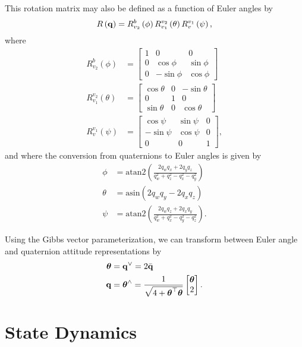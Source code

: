 \documentclass[english]{article}
\begin{document}
This rotation matrix may also be defined as a function of Euler angles by
\begin{equation}
R\left(\bf{q}\right) = R_{v_2}^b\left(\phi\right)R_{v_1}^{v_2}\left(\theta\right)R_v^{v_1}\left(\psi\right),
\end{equation}
where
\begin{align}
R_{v_2}^b\left(\phi\right) & = \begin{bmatrix} 1 & 0 & 0 \\ 0 & \cos\phi & \sin\phi \\ 0 & -\sin\phi & \cos\phi \end{bmatrix} \\
R_{v_1}^{v_2}\left(\theta\right) & = \begin{bmatrix} \cos\theta & 0 & -\sin\theta \\ 0 & 1 & 0 \\ \sin\theta & 0 & \cos\theta \end{bmatrix} \\
R_v^{v_1}\left(\psi\right) & = \begin{bmatrix} \cos\psi & \sin\psi & 0 \\ -\sin\psi & \cos\psi & 0 \\ 0 & 0 & 1 \end{bmatrix},
\end{align}
and where the conversion from quaternions to Euler angles is given by
\begin{align}
\phi & = \mathrm{atan2}\left( \frac{2q_w q_x+2q_y q_z}{q_w^2+q_z^2-q_x^2-q_y^2} \right) \\
\theta & = \mathrm{asin}\left( 2q_w q_y - 2q_x q_z \right) \\
\psi & = \mathrm{atan2}\left( \frac{2q_w q_z+2q_x q_y}{q_w^2+q_x^2-q_y^2-q_z^2} \right).
\end{align}

Using the Gibbs vector parameterization, we can transform between Euler angle and quaternion attitude representations by
\begin{align}
\boldsymbol{\theta} & = {\bf q}^{\lor} = 2\bar{{\bf q}} \\
{\bf q} & = \boldsymbol{\theta}^{\land} = \frac{1}{\sqrt{4+\boldsymbol{\theta}^\top \boldsymbol{\theta}}} \begin{bmatrix} \boldsymbol{\theta} \\ 2 \end{bmatrix}.
\end{align}



\section{State Dynamics}
\end{document}
